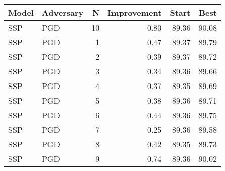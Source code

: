 \begin{tabular}{llrrrr}
\toprule
Model & Adversary &   N &  Improvement &  Start &   Best \\
\midrule
  SSP &       PGD &  10 &         0.80 &  89.36 &  90.08 \\
  SSP &       PGD &   1 &         0.47 &  89.37 &  89.79 \\
  SSP &       PGD &   2 &         0.39 &  89.37 &  89.72 \\
  SSP &       PGD &   3 &         0.34 &  89.36 &  89.66 \\
  SSP &       PGD &   4 &         0.37 &  89.35 &  89.69 \\
  SSP &       PGD &   5 &         0.38 &  89.36 &  89.71 \\
  SSP &       PGD &   6 &         0.44 &  89.36 &  89.75 \\
  SSP &       PGD &   7 &         0.25 &  89.36 &  89.58 \\
  SSP &       PGD &   8 &         0.42 &  89.35 &  89.73 \\
  SSP &       PGD &   9 &         0.74 &  89.36 &  90.02 \\
\bottomrule
\end{tabular}
